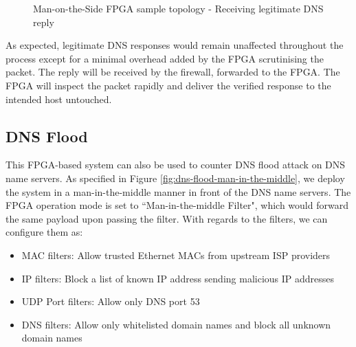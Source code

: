 \documentclass[a4paper]{report}
\begin{document}
\begin{figure}[H]
  \caption{Man-on-the-Side FPGA sample topology - Receiving legitimate DNS reply}
\end{figure}

As expected, legitimate DNS responses would remain unaffected throughout the process except for a minimal overhead added by the FPGA scrutinising the packet. The reply will be received by the firewall, forwarded to the FPGA. The FPGA will inspect the packet rapidly and deliver the verified response to the intended host untouched.

\subsection{DNS Flood}

This FPGA-based system can also be used to counter DNS flood attack on DNS name servers. As specified in Figure \ref{fig:dns-flood-man-in-the-middle}, we deploy the system in a man-in-the-middle manner in front of the DNS name servers. The FPGA operation mode is set to ``Man-in-the-middle Filter", which would forward the same payload upon passing the filter. With regards to the filters, we can configure them as:

\begin{itemize}
    \item MAC filters: Allow trusted Ethernet MACs from upstream ISP providers
    \item IP filters: Block a list of known IP address sending malicious IP addresses
    \item UDP Port filters: Allow only DNS port 53
    \item DNS filters: Allow only whitelisted domain names and block all unknown domain names
\end{itemize}
\end{document}

